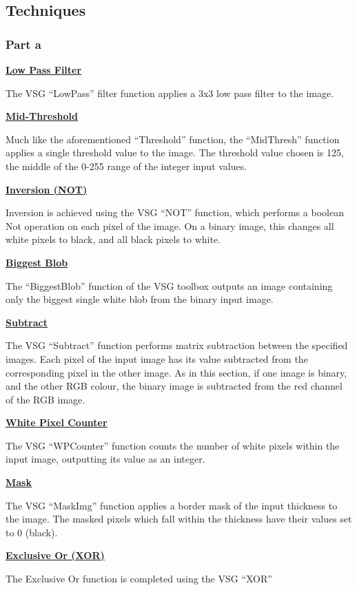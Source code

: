 \documentclass[a4paper]{article}
\begin{document}
	\subsection{Techniques}
	\subsubsection{Part a}
	\underline{\textbf{Low Pass Filter}}
	\par The VSG ``LowPass'' filter function applies a 3x3 low pass filter
	to the image.
	\par\underline{\textbf{Mid-Threshold}}
	\par Much like the aforementioned ``Threshold'' function, the
	``MidThresh'' function applies a single threshold value to the image.
	The threshold value chosen is 125, the middle of the 0-255 range of the
	integer input values.
	\par\underline{\textbf{Inversion (NOT)}}
	\par Inversion is achieved using the VSG ``NOT'' function, which
	performs a boolean Not operation on each pixel of the image. On a binary
	image, this changes all white pixels to black, and all black pixels to
	white.
	\par\underline{\textbf{Biggest Blob}}
	\par The ``BiggestBlob'' function of the VSG toolbox outputs an image
	containing only the biggest single white blob from the binary input
	image.
	\par\underline{\textbf{Subtract}}
	\par The VSG ``Subtract'' function performs matrix subtraction between the
	specified images. Each pixel of the input image has its value
	subtracted from the corresponding pixel in the other image. As in this
	section, if one	image is binary, and the other RGB colour, the binary
	image is subtracted from the red channel of the RGB image.
	\par\underline{\textbf{White Pixel Counter}}
	\par The VSG ``WPCounter'' function counts the number of white pixels
	within the input image, outputting its value as an integer.
	\par\underline{\textbf{Mask}}
	\par The VSG ``MaskImg'' function applies a border mask of the input
	thickness to the image. The masked pixels which fall within the
	thickness have their values set to 0 (black).
	\par\underline{\textbf{Exclusive Or (XOR)}}
	\par The Exclusive Or function is completed using the VSG ``XOR''
\end{document}
